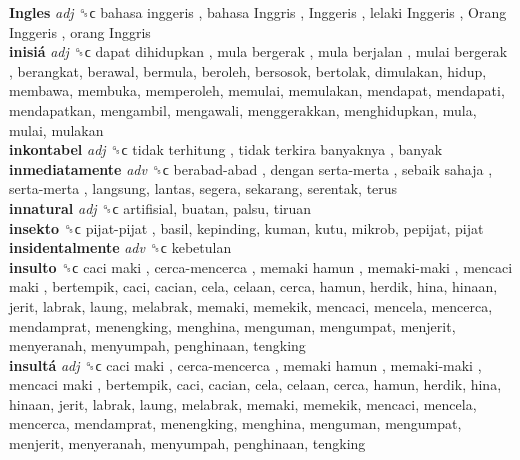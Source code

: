 \textbf{Ingles} \emph{adj}  ␝ϲ   bahasa inggeris ,  bahasa Inggris ,  Inggeris ,  lelaki Inggeris ,  Orang Inggeris ,  orang Inggris   \\
\textbf{inisiá} \emph{adj}  ␝ϲ   dapat dihidupkan ,  mula bergerak ,  mula berjalan ,  mulai bergerak , berangkat, berawal, bermula, beroleh, bersosok, bertolak, dimulakan, hidup, membawa, membuka, memperoleh, memulai, memulakan, mendapat, mendapati, mendapatkan, mengambil, mengawali, menggerakkan, menghidupkan, mula, mulai, mulakan  \\
\textbf{inkontabel} \emph{adj}  ␝ϲ   tidak terhitung ,  tidak terkira banyaknya , banyak  \\
\textbf{inmediatamente} \emph{adv}  ␝ϲ   berabad-abad ,  dengan serta-merta ,  sebaik sahaja ,  serta-merta , langsung, lantas, segera, sekarang, serentak, terus  \\
\textbf{innatural} \emph{adj}  ␝ϲ  artifisial, buatan, palsu, tiruan  \\
\textbf{insekto} ␝ϲ   pijat-pijat , basil, kepinding, kuman, kutu, mikrob, pepijat, pijat  \\
\textbf{insidentalmente} \emph{adv}  ␝ϲ  kebetulan  \\
\textbf{insulto} ␝ϲ   caci maki ,  cerca-mencerca ,  memaki hamun ,  memaki-maki ,  mencaci maki , bertempik, caci, cacian, cela, celaan, cerca, hamun, herdik, hina, hinaan, jerit, labrak, laung, melabrak, memaki, memekik, mencaci, mencela, mencerca, mendamprat, menengking, menghina, menguman, mengumpat, menjerit, menyeranah, menyumpah, penghinaan, tengking  \\
\textbf{insultá} \emph{adj}  ␝ϲ   caci maki ,  cerca-mencerca ,  memaki hamun ,  memaki-maki ,  mencaci maki , bertempik, caci, cacian, cela, celaan, cerca, hamun, herdik, hina, hinaan, jerit, labrak, laung, melabrak, memaki, memekik, mencaci, mencela, mencerca, mendamprat, menengking, menghina, menguman, mengumpat, menjerit, menyeranah, menyumpah, penghinaan, tengking  \\
